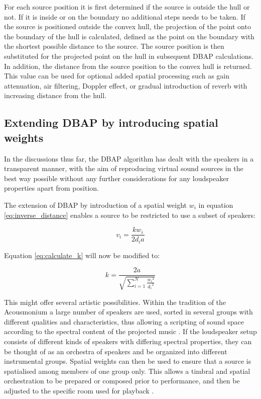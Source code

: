 \documentclass[twoside,10pt]{article}
\begin{document}
For each source position it is first determined if the source is outside the hull or not. If it is inside or on the boundary no additional steps needs to be taken. If the source is positioned outside the convex hull, the projection of the point onto the boundary of the hull is calculated, defined as the point on the boundary with the shortest possible distance to the source. The source position is then substituted for the projected point on the hull in subsequent DBAP calculations. In addition, the distance from the source position to the convex hull is returned. This value can be used for optional added spatial processing such as gain attenuation, air filtering, Doppler effect, or gradual introduction of reverb with increasing distance from the hull.




\subsection{Extending DBAP by introducing spatial weights}

In the discussions thus far, the DBAP algorithm has dealt with the speakers in a transparent manner, with the aim of reproducing virtual sound sources in the best way possible without any further considerations for any loudspeaker properties apart from position.

The extension of DBAP by introduction of a spatial weight $w_{i}$ in equation \ref{eq:inverse_distance} enables a source to be restricted to use a subset of speakers:

\begin{equation} \label{eq:inverse_distance_weighed}
v_{i} = \frac{k w_{i}}{2 d_{i} a} 
\end{equation}

Equation \ref{eq:calculate_k} will now be modified to:

\begin{equation} \label{eq:calculate_k_weighted}
k = \frac{2a}{\sqrt{\sum_{i=1}^{N} \frac{{w_{i}}^2}{{d_{i}}^2}}}
\end{equation}

This might offer several artistic possibilities. Within the tradition of the Acousmonium \cite{Bayle:1993MusiqueAcousmatique} a large number of speakers are used, sorted in several groups with different qualities and characteristics, thus allowing a scripting of sound space according to the spectral content of the projected music \cite{Prager:2002acousmatique}. If the loudspeaker setup consists of different kinds of speakers with differing spectral properties, they can be thought of as an orchestra of speakers and be organized into different instrumental groups. Spatial weights can then be used to ensure that a source is spatialised among members of one group only. This allows a timbral and spatial orchestration to be prepared or composed prior to performance, and then be adjusted to the specific room used for playback \cite{Lyon:2008spatial_orchestration}. 
\end{document}
